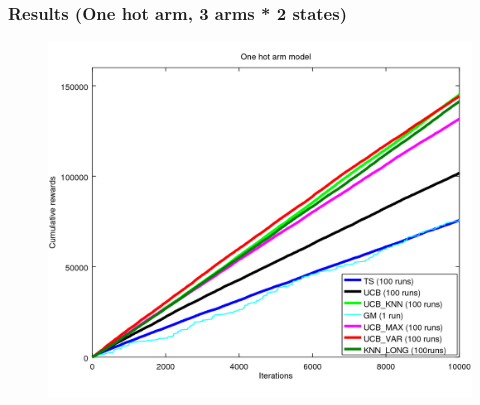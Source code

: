 \documentclass[french]{beamer}
\begin{document}
\begin{frame}
	\frametitle{Results (One hot arm, 3 arms * 2 states)}

	\begin{figure}[h]
		\begin{center}
			\vspace{-10pt}
			\includegraphics[width=1.05\textheight]{all_10000it.png}

			\vspace{-10pt}
		\end{center}
	\end{figure}
\end{frame}
\end{document}
